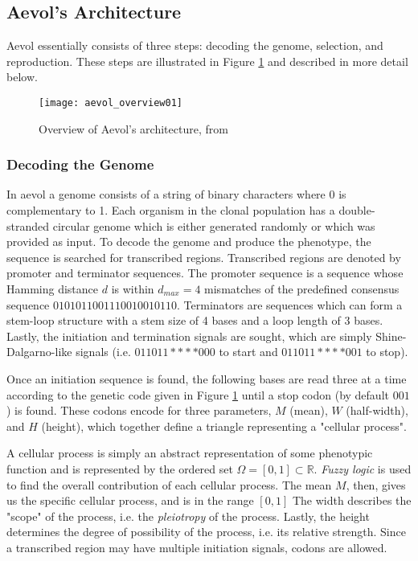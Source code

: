 \subsection{Aevol's Architecture}
Aevol essentially consists of three steps: decoding the genome, selection, and reproduction. These steps are illustrated in Figure \ref{fig:aevol_overview01} and described in more detail below. 

\begin{figure}[H]\label{fig:aevol_overview01}
	\texttt{[image: aevol\_overview01]}
	\centering
	\caption[Overview of Aevol's architecture.]{Overview of Aevol's architecture, from \cite{Batut.2013}}
\end{figure}
\subsubsection{Decoding the Genome}
In aevol a genome consists of a string of binary characters where 0 is complementary to 1. Each organism in the clonal population has a double-stranded circular genome which is either generated randomly or which was provided as input. To decode the genome and produce the phenotype, the sequence is searched for transcribed regions. Transcribed regions are denoted by promoter and terminator sequences. The promoter sequence is a sequence whose Hamming distance $d$ is within $d_{max} = 4$ mismatches of the predefined consensus sequence $0101011001110010010110$. Terminators are sequences which can form a stem-loop structure with a stem size of 4 bases and a loop length of 3 bases. Lastly, the initiation and termination signals are sought, which are simply Shine-Dalgarno-like signals (i.e. $011011****000$ to start and $011011****001$ to stop). 

Once an initiation sequence is found, the following bases are read three at a time according to the genetic code given in Figure \ref{fig:aevol_overview01} until a stop codon (by default $001$) is found. These codons encode for three parameters, $M$ (mean), $W$ (half-width), and $H$ (height), which together define a triangle representing a "cellular process".

A cellular process is simply an abstract representation of some phenotypic function and is represented by the ordered set $\Omega = \left[0,1\right] \subset \mathbb{R}$. \textit{Fuzzy logic} is used to find the overall contribution of each cellular process. The mean $M$, then, gives us the specific cellular process, and is in the range $\left[0,1\right]$ The width describes the "scope" of the process, i.e. the \textit{pleiotropy} of the process. Lastly, the height determines the degree of possibility of the process, i.e. its relative strength. Since a transcribed region may have multiple initiation signals, codons are allowed.  

